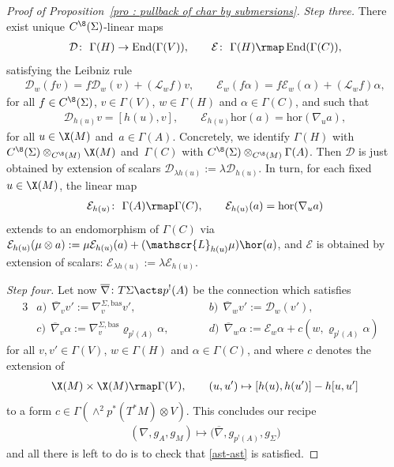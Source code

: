 \begin{proof}[Proof of Proposition~\ref{pro : pullback of char by submersions}]
{\it Step three.} There exist unique $C^{\8}(\Sigma)$-linear maps
 \begin{gather*}
 \mathcal{D}\colon \ \Gamma(H) \to \operatorname{End}(\Gamma(V)), \qquad \mathcal{E}\colon \ \Gamma(H) \rmap \operatorname{End}(\Gamma(C)),
 \end{gather*}satisfying the Leibniz rule
 \begin{gather*}
 \mathcal{D}_{w}(fv) = f\mathcal{D}_{w}(v) + (\mathscr{L}_{w}f)v, \qquad \mathcal{E}_{w}(f\alpha) = f\mathcal{E}_{w}(\alpha)+(\mathscr{L}_wf)\alpha,
 \end{gather*}for all $f \in C^{\8}(\Sigma)$, $v \in \Gamma(V)$, $w \in \Gamma(H)$ and $\alpha \in \Gamma(C)$, and such that
 \begin{gather*}
 \mathcal{D}_{h(u)}v = [h(u),v], \qquad \mathcal{E}_{h(u)}\mathrm{hor}(a) = \mathrm{hor}(\nabla_ua),
 \end{gather*}for all $u \in \X(M)$ and~$a \in \Gamma(A)$. Concretely, we identify $\Gamma(H)$ with $C^{\8}(\Sigma) \otimes_{C^{\8}(M)} \X(M)$ and~$\Gamma(C)$ with $C^{\8}(\Sigma) \otimes_{C^{\8}(M)} \Gamma(A)$. Then $\mathcal{D}$ is just obtained by extension of scalars $\mathcal{D}_{\lambda h(u)}:=\lambda\mathcal{D}_{h(u)}$. In turn, for each fixed $u \in \X(M)$, the linear map
 \begin{gather*}
 \mathcal{E}_{h(u)}\colon \ \Gamma(A) \rmap \Gamma(C), \qquad \mathcal{E}_{h(u)}(a)=\mathrm{hor}(\nabla_ua)
 \end{gather*}extends to an endomorphism of $\Gamma(C)$ via $\mathcal{E}_{h(u)}(\mu \otimes a):=\mu \mathcal{E}_{h(u)}(a)+(\mathscr{L}_{h(u)}\mu)\hor(a)$, and $\mathcal{E}$ is obtained by extension of scalars: $\mathcal{E}_{\lambda h(u)}:=\lambda \mathcal{E}_{h(u)}$.

{\it Step four.} Let now $\overline{\nabla}\colon T\Sigma \acts p^!(A)$ be the connection which satisfies
 \begin{alignat*}{3}
& a) \ \ \overline{\nabla}_vv':=\nabla^{\Sigma,\mathrm{bas}}_{v}v', \qquad && b) \ \ \overline{\nabla}_{w}v':=\mathcal{D}_w(v'), & \\
& c) \ \ \overline{\nabla}_v\alpha:=\nabla^{\Sigma,\mathrm{bas}}_{v}\varrho_{p^!(A)}\alpha, \qquad && d) \ \ \overline{\nabla}_{w}\alpha:=\mathcal{E}_{w}\alpha+c(w,\varrho_{p^!(A)}\alpha)&
 \end{alignat*} for all $v,v' \in \Gamma(V)$, $w \in \Gamma(H)$ and $\alpha \in \Gamma(C)$, and where $c$ denotes the extension of
 \begin{gather*}
 \X(M) \times \X(M) \rmap \Gamma(V), \qquad (u,u') \mapsto [h(u),h(u')]-h[u,u']
 \end{gather*}to a form $c\in \Gamma(\wedge^2p^*(T^*M)\otimes V)$. This concludes our recipe
 \begin{gather*}
 (\nabla,g_A,g_M) \mapsto \big(\overline{\nabla},g_{p^!(A)},g_{\Sigma}\big)
 \end{gather*}and all there is left to do is to check that \eqref{ast-ast} is satisfied.


\end{proof}

